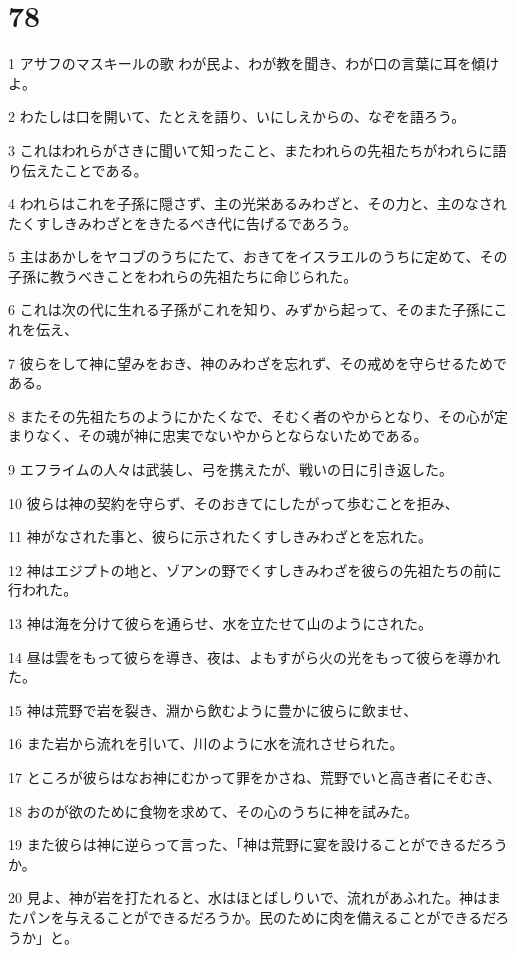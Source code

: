 \chapter{78}

\par 1 アサフのマスキールの歌 わが民よ、わが教を聞き、わが口の言葉に耳を傾けよ。
\par 2 わたしは口を開いて、たとえを語り、いにしえからの、なぞを語ろう。
\par 3 これはわれらがさきに聞いて知ったこと、またわれらの先祖たちがわれらに語り伝えたことである。
\par 4 われらはこれを子孫に隠さず、主の光栄あるみわざと、その力と、主のなされたくすしきみわざとをきたるべき代に告げるであろう。
\par 5 主はあかしをヤコブのうちにたて、おきてをイスラエルのうちに定めて、その子孫に教うべきことをわれらの先祖たちに命じられた。
\par 6 これは次の代に生れる子孫がこれを知り、みずから起って、そのまた子孫にこれを伝え、
\par 7 彼らをして神に望みをおき、神のみわざを忘れず、その戒めを守らせるためである。
\par 8 またその先祖たちのようにかたくなで、そむく者のやからとなり、その心が定まりなく、その魂が神に忠実でないやからとならないためである。
\par 9 エフライムの人々は武装し、弓を携えたが、戦いの日に引き返した。
\par 10 彼らは神の契約を守らず、そのおきてにしたがって歩むことを拒み、
\par 11 神がなされた事と、彼らに示されたくすしきみわざとを忘れた。
\par 12 神はエジプトの地と、ゾアンの野でくすしきみわざを彼らの先祖たちの前に行われた。
\par 13 神は海を分けて彼らを通らせ、水を立たせて山のようにされた。
\par 14 昼は雲をもって彼らを導き、夜は、よもすがら火の光をもって彼らを導かれた。
\par 15 神は荒野で岩を裂き、淵から飲むように豊かに彼らに飲ませ、
\par 16 また岩から流れを引いて、川のように水を流れさせられた。
\par 17 ところが彼らはなお神にむかって罪をかさね、荒野でいと高き者にそむき、
\par 18 おのが欲のために食物を求めて、その心のうちに神を試みた。
\par 19 また彼らは神に逆らって言った、「神は荒野に宴を設けることができるだろうか。
\par 20 見よ、神が岩を打たれると、水はほとばしりいで、流れがあふれた。神はまたパンを与えることができるだろうか。民のために肉を備えることができるだろうか」と。
